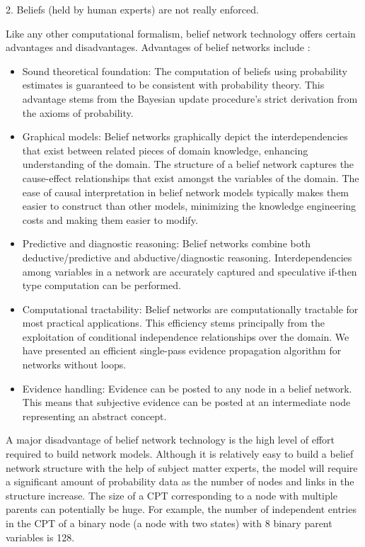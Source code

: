\documentclass[11pt]{article}
\begin{document}
2. Beliefs (held by human experts) are not really enforced.

Like any other computational formalism, belief network technology offers certain
advantages and disadvantages. Advantages of belief networks include
\cite{das:decision-making-agents}:

\begin{itemize}
  \item Sound theoretical foundation: The computation of beliefs using
  probability estimates is guaranteed to be consistent with probability theory.
  This advantage stems from the Bayesian update procedure’s strict derivation
  from the axioms of probability.
  \item Graphical models: Belief networks graphically depict the
  interdependencies that exist between related pieces of domain knowledge,
  enhancing understanding of the domain. The structure of a belief network
  captures the cause-effect relationships that exist amongst the variables of
  the domain. The ease of causal interpretation in belief network models
  typically makes them easier to construct than other models, minimizing the
  knowledge engineering costs and making them easier to modify.
  \item Predictive and diagnostic reasoning: Belief networks combine both
  deductive/predictive and abductive/diagnostic reasoning. Interdependencies
  among variables in a network are accurately captured and speculative if-then
  type computation can be performed.
  \item Computational tractability: Belief networks are computationally
  tractable for most practical applications. This efficiency stems principally
  from the exploitation of conditional independence relationships over the
  domain. We have presented an efficient single-pass evidence propagation
  algorithm for networks without loops.
  \item Evidence handling: Evidence can be posted to any node in a belief
  network. This means that subjective evidence can be posted at an intermediate
  node representing an abstract concept.
\end{itemize}

A major disadvantage of belief network technology is the high level of effort
required to build network models. Although it is relatively easy to build a
belief network structure with the help of subject matter experts, the model will
require a significant amount of probability data as the number of nodes and
links in the structure increase. The size of a CPT corresponding to a node with
multiple parents can potentially be huge. For example, the number of independent
entries in the CPT of a binary node (a node with two states) with 8 binary
parent variables is 128.
\end{document}
